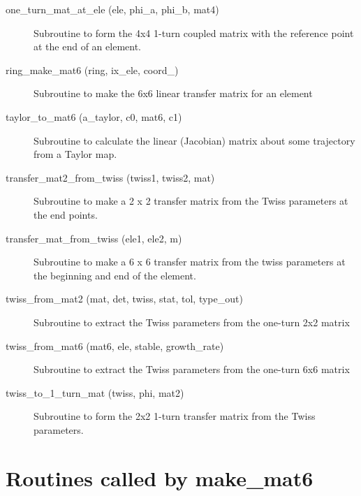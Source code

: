 \begin{description}
\item[one\_turn\_mat\_at\_ele (ele, phi\_a, phi\_b, mat4)] \Newline
Subroutine to form the 4x4 1-turn coupled matrix with the reference point 
at the end of an element. 

\item[ring\_make\_mat6 (ring, ix\_ele, coord\_)] \Newline
Subroutine to make the 6x6 linear transfer matrix for an element 

\item[taylor\_to\_mat6 (a\_taylor, c0, mat6, c1)] \Newline
Subroutine to calculate the linear (Jacobian) matrix about some trajectory from a Taylor map. 

\item[transfer\_mat2\_from\_twiss (twiss1, twiss2, mat)] \Newline
Subroutine to make a 2 x 2 transfer matrix from the Twiss parameters at the end points. 

\item[transfer\_mat\_from\_twiss (ele1, ele2, m)] \Newline 
Subroutine to make a 6 x 6 transfer matrix from the twiss parameters
at the beginning and end of the element.

\item[twiss\_from\_mat2 (mat, det, twiss, stat, tol, type\_out)] \Newline
Subroutine to extract the Twiss parameters from the one-turn 2x2 matrix 

\item[twiss\_from\_mat6 (mat6, ele, stable, growth\_rate)] \Newline
Subroutine to extract the Twiss parameters from the one-turn 6x6 matrix 

\item[twiss\_to\_1\_turn\_mat (twiss, phi, mat2)] \Newline
Subroutine to form the 2x2 1-turn transfer matrix from the Twiss parameters. 

\end{description}

\section{Routines called by make\_mat6}
\label{r:mat6}

